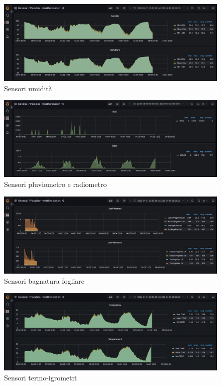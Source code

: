 \documentclass{article}
\begin{document}
\begin{figure}[H]
\includegraphics[width=1\linewidth]{Humidity-Graph}
\centering
\caption*{Sensori umidità}
\label{fig:bytepost}
\end{figure}

\begin{figure}[H]
\includegraphics[width=1\linewidth]{Rain-Solar-Graph}
\centering
\caption*{Sensori pluviometro e radiometro}
\label{fig:bytepost}
\end{figure}

\begin{figure}[H]
\includegraphics[width=1\linewidth]{LeafWetness-Graph}
\centering
\caption*{Sensori bagnatura fogliare}
\label{fig:bytepost}
\end{figure}

\begin{figure}[H]
\includegraphics[width=1\linewidth]{Temperature-Graph}
\centering
\caption*{Sensori termo-igrometri}
\label{fig:bytepost}
\end{figure}
\end{document}
